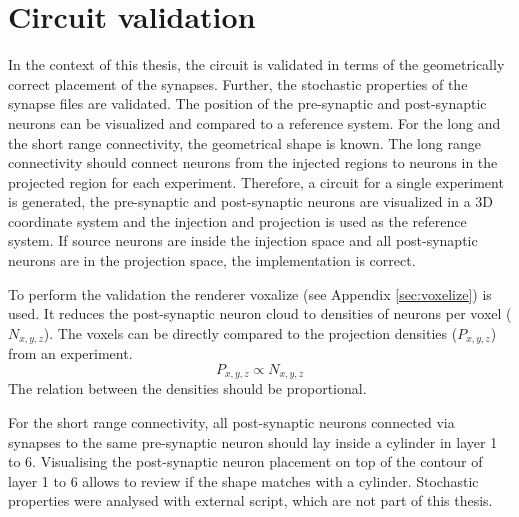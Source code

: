 \section{Circuit validation}
In the context of this thesis, the circuit is validated in terms of the geometrically correct placement of
the synapses. Further, the stochastic properties of the synapse files are validated.
The position of the pre-synaptic and post-synaptic neurons can be visualized and  compared to a 
reference system. For the long and the short range connectivity, the geometrical shape is known.
The long range connectivity should connect neurons from the injected regions to neurons
in the projected region for each experiment. Therefore, a circuit for a single experiment is 
generated, the pre-synaptic and post-synaptic neurons are visualized in a 3D coordinate system and the injection
and projection is used as the reference system. If source neurons are inside the injection space and all
post-synaptic neurons are in the projection space, the implementation is correct.

To perform the validation the renderer voxalize (see Appendix \ref{sec:voxelize}) is used.
It reduces the post-synaptic neuron cloud to densities of neurons per voxel ($N_{x,y,z}$).
The voxels can be directly compared to the projection densities ($P_{x,y,z}$) from an experiment.
\begin{equation}
	P_{x,y,z} \propto N_{x,y,z}
\end{equation}
The relation between the densities should be proportional.

For the short range connectivity, all post-synaptic neurons connected via synapses to the same pre-synaptic neuron should
lay inside a cylinder in layer 1 to 6. Visualising the post-synaptic neuron placement on top of the contour of layer 1 to
6 allows to review if the shape matches with a cylinder.
Stochastic properties were analysed with external script, which are not part of this thesis.

